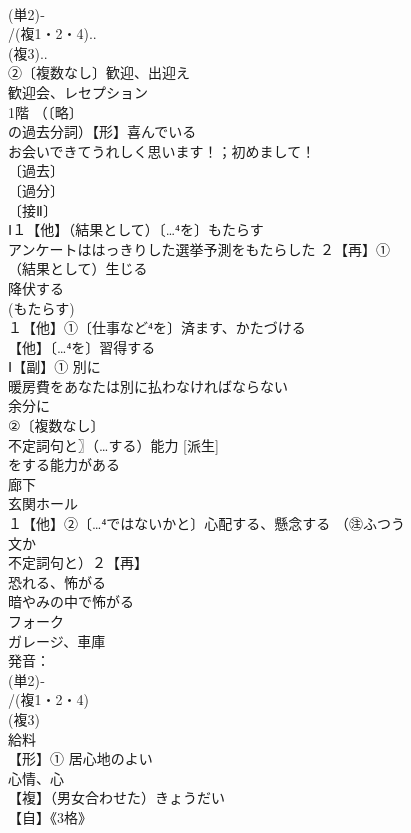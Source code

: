 \documentclass[8pt]{extreport}
\begin{document}
\begin{CJK}{UTF8}{min}
\\	(単2)‐
\\	/(複1・2・4)..
\\	(複3)..
\\	②〔複数なし〕歓迎、出迎え 
\\	歓迎会、レセプション
\\	1階 （〔略〕
\\	の過去分詞）【形】喜んでいる 
\\	お会いできてうれしく思います！；初めまして！
\\	〔過去〕
\\	〔過分〕
\\	〔接Ⅱ〕
\\	Ⅰ１【他】（結果として）〔…⁴を〕もたらす 
\\	アンケートははっきりした選挙予測をもたらした ２【再】①
\\	（結果として）生じる 
\\	降伏する 
\\	(もたらす)
\\	１【他】①〔仕事など⁴を〕済ます、かたづける
\\	【他】〔…⁴を〕習得する
\\	Ⅰ【副】① 別に 
\\	暖房費をあなたは別に払わなければならない 
\\	余分に
\\	②〔複数なし〕
\\	不定詞句と〗（…する）能力 [派生] 
\\	をする能力がある
\\	廊下 
\\	玄関ホール
\\	１【他】②〔…⁴ではないかと〕心配する、懸念する （㊟ふつう
\\	文か
\\	不定詞句と）２【再】
\\	恐れる、怖がる 
\\	暗やみの中で怖がる
\\	フォーク 
\\	ガレージ、車庫 
\\	発音：
\\	(単2)‐
\\	/(複1・2・4)
\\	(複3)
\\	給料 
\\	【形】① 居心地のよい 
\\	心情、心
\\	【複】（男女合わせた）きょうだい
\\	【自】《3格》

\end{CJK}
\end{document}
